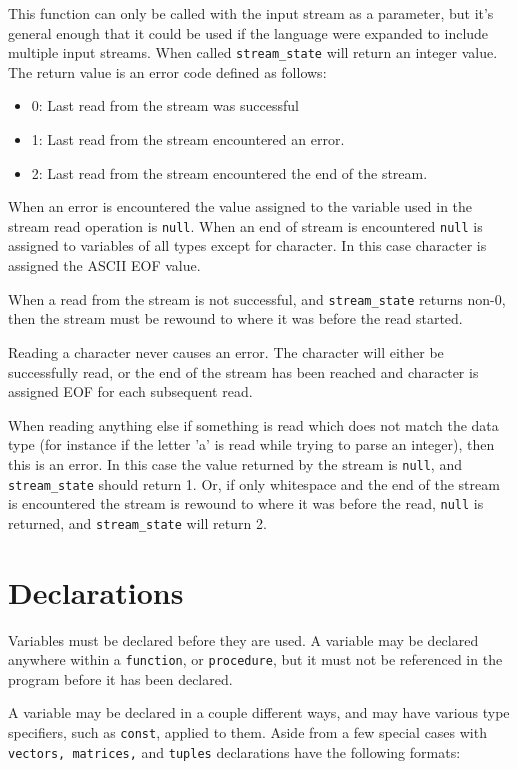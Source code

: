 \documentclass{article}
\begin{document}
		This function can only be called with the input stream as a parameter, but it's general enough that it could be
		used if the language were expanded to include multiple input streams.
		When called \texttt{stream\_state} will return an integer value. The return value is an error code defined as
		follows:
		\begin{itemize}
			\item 0: Last read from the stream was successful
			\item 1: Last read from the stream encountered an error.
			\item 2: Last read from the stream encountered the end of the stream.
		\end{itemize}

		When an error is encountered the value assigned to the variable used in the stream read operation is
		\texttt{null}. When an end of stream is encountered \texttt{null} is assigned to variables of all types except
		for character. In this case character is assigned the ASCII EOF value.

		When a read from the stream is not successful, and \texttt{stream\_state} returns non-0, then the stream must be
		rewound to where it was before the read started.

		Reading a character never causes an error. The character will either be successfully read, or the end of the
		stream has been reached and character is assigned EOF for each subsequent read.

		When reading anything else if something is read which does not match the data type (for instance if the letter
		'a' is read while trying to parse an integer), then this is an error. In this case the value returned by the
		stream is \texttt{null}, and \texttt{stream\_state} should return 1. Or, if only whitespace and the end of the
		stream is encountered the stream is rewound to where it was before the read, \texttt{null} is returned, and
		\texttt{stream\_state} will return 2.


\section{Declarations}\label{sec:declaration}

	Variables must be declared before they are used. A variable may be declared anywhere within a \texttt{function}, or
	\texttt{procedure}, but it must not be referenced in the program before it has been declared.

	A variable may be declared in a couple different ways, and may have various type specifiers, such as \texttt{const},
	applied to them. Aside from a few special cases with \texttt{vectors, matrices,} and \texttt{tuples} declarations
	have the following formats:
\end{document}
